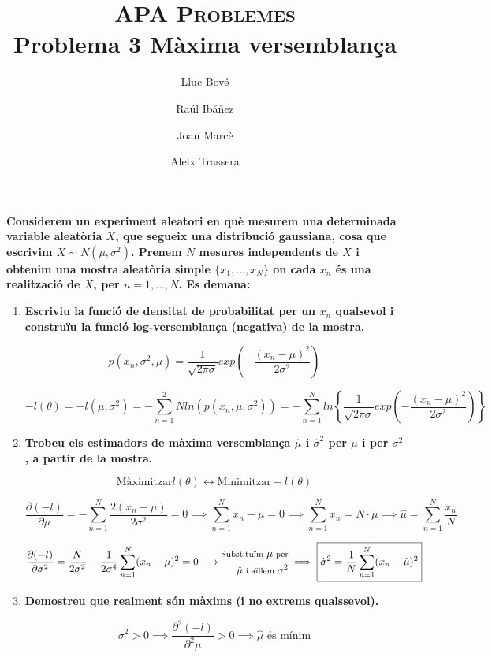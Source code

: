 \documentclass[a4paper]{article}
\title{\textsc{APA Problemes} \\ Problema 3 Màxima versemblança}
\author{Lluc Bové \and Raúl Ibáñez \and Joan Marcè \and Aleix Trassera}
\date{}
\begin{document}
\maketitle

\textbf{Considerem un experiment aleatori en què mesurem una determinada variable aleatòria $X$, que segueix una distribució gaussiana, cosa que escrivim $X \sim N(\mu, \sigma^2)$. Prenem $N$ mesures independents de $X$ i obtenim una mostra aleatòria simple $\{x_1, ..., x_N\}$ on cada $x_n$ és una realització de $X$, per $n=1,...,N$. Es demana:}

\begin{enumerate}
\item \textbf{Escriviu la funció de densitat de probabilitat per un $x_n$ qualsevol i construïu la funció log-versemblança (negativa) de la mostra.}

$$p(x_n, \sigma^2, \mu) = \frac{1}{\sqrt{2\pi\sigma}} exp\left(-\frac{(x_n - \mu)^2}{2\sigma^2}\right)$$

$$ -l(\theta) = -l(\mu,\sigma^2) = -\sum_{n=1}^2N ln(p(x_n, \mu, \sigma^2)) = - \sum_{n=1}^N ln \left\{\frac{1}{\sqrt{2\pi\sigma}} exp\left(-\frac{(x_n - \mu)^2}{2\sigma^2}\right) \right\}$$

\item \textbf{Trobeu els estimadors de màxima versemblança $\hat{\mu}$ i $\hat{\sigma}^2$ per $\mu$ i per $\sigma^2$, a partir de la mostra.}

$$\text{Màximitzar} l(\theta) \leftrightarrow \text{Minimitzar} -l(\theta)$$

$$ \frac{\partial(-l)}{\partial\mu} = -\sum_{n=1}^N \frac{2(x_n - \mu)}{2\sigma^2} = 0 \implies 
\sum_{n=1}^N x_n - \mu = 0 \implies \sum_{n=1}^N x_n = N·\mu \implies \boxed{\hat{\mu} = \sum_{n=1}^N \frac{x_n}{N}}$$ 

$$
\frac{\partial(-l)}{\partial\sigma^2} = \frac{N}{2\sigma^2} - \frac{1}{2\sigma^4}\sum_{n=1}^N (x_n - \mu)^2 = 0 \longrightarrow
\begin{aligned}
\footnotesize
\text{Substituïm } \mu \text{ per}\\
\footnotesize
\hat{\mu} \text{ i aïllem } \sigma^2 
\end{aligned} 
\implies \boxed{\hat{\sigma}^2 = \frac{1}{N} \sum_{n=1}^N (x_n - \hat{\mu})^2} $$

\item \textbf{Demostreu que realment són màxims (i no extrems qualssevol).}

$$ \sigma^2 > 0 \implies \frac{\partial^2(-l)}{\partial^2\mu} > 0 \implies \hat{\mu} \text{ és mínim}$$


\end{enumerate}
\end{document}

